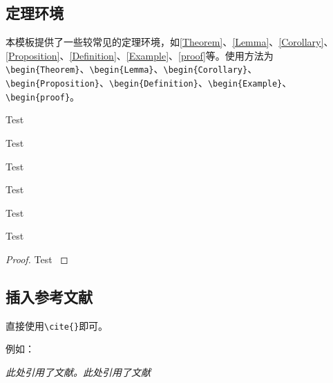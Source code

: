 \documentclass[12pt,hyperref,a4paper,UTF8]{ctexart}
\begin{document}
\subsection{定理环境}

本模板提供了一些较常见的定理环境，如\autoref{Theorem}、\autoref{Lemma}、\autoref{Corollary}、\autoref{Proposition}、\autoref{Definition}、\autoref{Example}、\autoref{proof}等。使用方法为\verb|\begin{Theorem}|、\verb|\begin{Lemma}|、\verb|\begin{Corollary}|、\verb|\begin{Proposition}|、\verb|\begin{Definition}|、\verb|\begin{Example}|、\verb|\begin{proof}|。

\begin{Theorem}
    Test
    \label{Theorem}
\end{Theorem}

\begin{Lemma}
    Test
    \label{Lemma}
\end{Lemma}

\begin{Corollary}
    Test
    \label{Corollary}
\end{Corollary}

\begin{Proposition}
    Test
    \label{Proposition}
\end{Proposition}

\begin{Definition}
    Test
    \label{Definition}
\end{Definition}

\begin{Example}
    Test
    \label{Example}
\end{Example}

\begin{proof}
    Test
    \label{proof}
\end{proof}

\subsection{插入参考文献}
直接使用\verb|\cite{}|即可。

例如：


   \textit{ 此处引用了文献\cite{OFDMAbackscatter}。此处引用了文献\cite{DigiScatter}}
\end{document}
